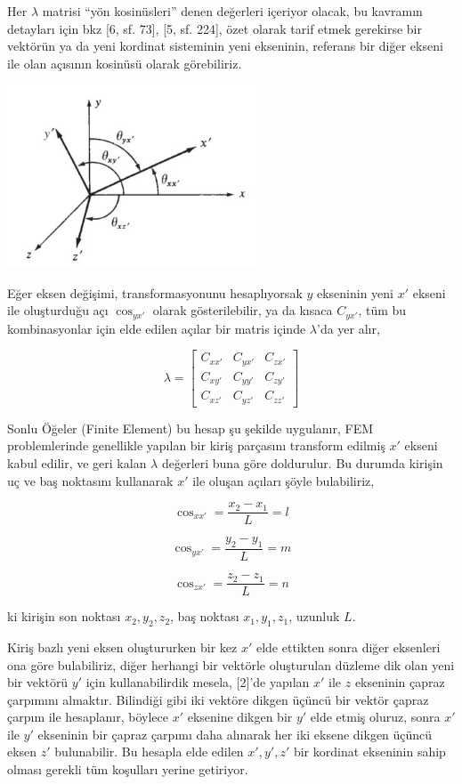 \documentclass[12pt,fleqn]{article}\usepackage{../../common}
\begin{document}
Her $\lambda$ matrisi ``yön kosinüsleri'' denen değerleri içeriyor olacak, bu
kavramın detayları için bkz [6, sf. 73], [5, sf. 224], özet olarak tarif etmek
gerekirse bir vektörün ya da yeni kordinat sisteminin yeni ekseninin, referans
bir diğer ekseni ile olan açısının kosinüsü olarak görebiliriz.

\includegraphics[width=20em]{phy_020_strs_11_04.jpg}

Eğer eksen değişimi, transformasyonunu hesaplıyorsak $y$ ekseninin yeni $x'$
ekseni ile oluşturduğu açı $\cos_{yx'}$ olarak gösterilebilir, ya da kısaca
$C_{yx'}$, tüm bu kombinasyonlar için elde edilen açılar bir matris içinde
$\lambda$'da yer alır,

$$
\lambda = \left[\begin{array}{ccc}
C_{xx'} & C_{yx'} & C_{zx'} \\
C_{xy'} & C_{yy'} & C_{zy'} \\
C_{xz'} & C_{yz'} & C_{zz'} 
\end{array}\right]
$$

Sonlu Öğeler (Finite Element) bu hesap şu şekilde uygulanır, FEM problemlerinde
genellikle yapılan bir kiriş parçasını transform edilmiş $x'$ ekseni kabul
edilir, ve geri kalan $\lambda$ değerleri buna göre doldurulur. Bu durumda
kirişin uç ve baş noktasını kullanarak $x'$ ile oluşan açıları şöyle
bulabiliriz,

$$
\cos_{xx'} = \frac{x_2 - x_1}{L} = l
$$

$$
\cos_{yx'} = \frac{y_2 - y_1}{L} = m
$$

$$
\cos_{zx'} = \frac{z_2 - z_1}{L} = n
$$

ki kirişin son noktası $x_2,y_2,z_2$, baş noktası $x_1,y_1,z_1$, uzunluk $L$.

Kiriş bazlı yeni eksen oluştururken bir kez $x'$ elde ettikten sonra diğer
eksenleri ona göre bulabiliriz, diğer herhangi bir vektörle oluşturulan düzleme
dik olan yeni bir vektörü $y'$ için kullanabilirdik mesela, [2]'de yapılan $x'$
ile $z$ ekseninin çapraz çarpımını almaktır. Bilindiği gibi iki vektöre dikgen
üçüncü bir vektör çapraz çarpım ile hesaplanır, böylece $x'$ eksenine dikgen bir
$y'$ elde etmiş oluruz, sonra $x'$ ile $y'$ ekseninin bir çapraz çarpımı daha
alınarak her iki eksene dikgen üçüncü eksen $z'$ bulunabilir.  Bu hesapla elde
edilen $x',y',z'$ bir kordinat ekseninin sahip olması gerekli tüm koşulları
yerine getiriyor.
\end{document}
